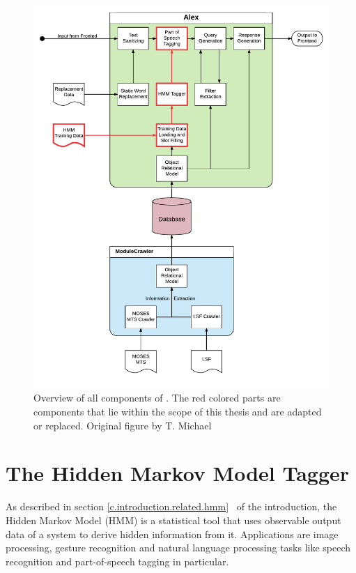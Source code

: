 \begin{figure}[H]
	\includegraphics[width=\textwidth]{images/alex_components}
	\caption[Component Overview of \Alex]{Overview of all components of \Alex. The red colored parts are components that lie within the scope of this thesis and are adapted or replaced. Original figure by T. Michael \cite{michael2016}}
	\label{f.alex_components}
\end{figure}

\section{The Hidden Markov Model Tagger}\label{c.alex.hmm}
As described in section \ref{c.introduction.related.hmm} \ of the introduction, the Hidden Markov Model (HMM) is a statistical tool that uses observable output data of a system to derive hidden information from it. Applications are image processing, gesture recognition and natural language processing tasks like speech recognition and part-of-speech tagging in particular.

